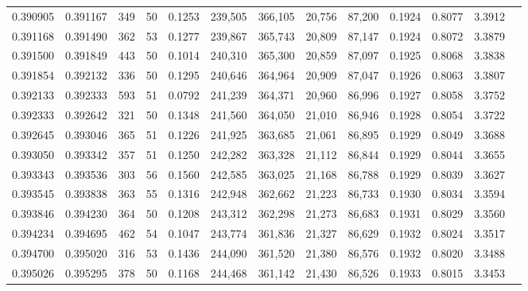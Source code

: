 \begin{tabular}{rrrrrrrrrrrrr}
0.390905 & 0.391167 &   349 &  50 &                                     0.1253 & 239,505 & 366,105 &  20,756 &  87,200 & 0.1924 & 0.8077 & 3.3912 \\
0.391168 & 0.391490 &   362 &  53 &                                     0.1277 & 239,867 & 365,743 &  20,809 &  87,147 & 0.1924 & 0.8072 & 3.3879 \\
0.391500 & 0.391849 &   443 &  50 &                                     0.1014 & 240,310 & 365,300 &  20,859 &  87,097 & 0.1925 & 0.8068 & 3.3838 \\
0.391854 & 0.392132 &   336 &  50 &                                     0.1295 & 240,646 & 364,964 &  20,909 &  87,047 & 0.1926 & 0.8063 & 3.3807 \\
0.392133 & 0.392333 &   593 &  51 &                                     0.0792 & 241,239 & 364,371 &  20,960 &  86,996 & 0.1927 & 0.8058 & 3.3752 \\
0.392333 & 0.392642 &   321 &  50 &                                     0.1348 & 241,560 & 364,050 &  21,010 &  86,946 & 0.1928 & 0.8054 & 3.3722 \\
0.392645 & 0.393046 &   365 &  51 &                                     0.1226 & 241,925 & 363,685 &  21,061 &  86,895 & 0.1929 & 0.8049 & 3.3688 \\
0.393050 & 0.393342 &   357 &  51 &                                     0.1250 & 242,282 & 363,328 &  21,112 &  86,844 & 0.1929 & 0.8044 & 3.3655 \\
0.393343 & 0.393536 &   303 &  56 &                                     0.1560 & 242,585 & 363,025 &  21,168 &  86,788 & 0.1929 & 0.8039 & 3.3627 \\
0.393545 & 0.393838 &   363 &  55 &                                     0.1316 & 242,948 & 362,662 &  21,223 &  86,733 & 0.1930 & 0.8034 & 3.3594 \\
0.393846 & 0.394230 &   364 &  50 &                                     0.1208 & 243,312 & 362,298 &  21,273 &  86,683 & 0.1931 & 0.8029 & 3.3560 \\
0.394234 & 0.394695 &   462 &  54 &                                     0.1047 & 243,774 & 361,836 &  21,327 &  86,629 & 0.1932 & 0.8024 & 3.3517 \\
0.394700 & 0.395020 &   316 &  53 &                                     0.1436 & 244,090 & 361,520 &  21,380 &  86,576 & 0.1932 & 0.8020 & 3.3488 \\
0.395026 & 0.395295 &   378 &  50 &                                     0.1168 & 244,468 & 361,142 &  21,430 &  86,526 & 0.1933 & 0.8015 & 3.3453 \\

\end{tabular}
